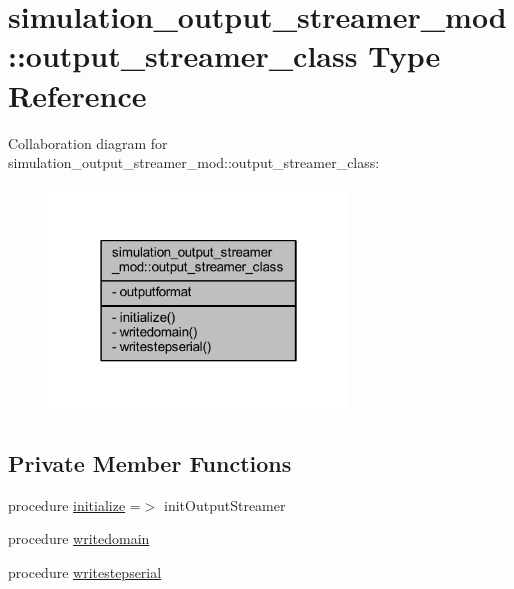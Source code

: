 \hypertarget{structsimulation__output__streamer__mod_1_1output__streamer__class}{}\section{simulation\+\_\+output\+\_\+streamer\+\_\+mod\+:\+:output\+\_\+streamer\+\_\+class Type Reference}
\label{structsimulation__output__streamer__mod_1_1output__streamer__class}


Collaboration diagram for simulation\+\_\+output\+\_\+streamer\+\_\+mod\+:\+:output\+\_\+streamer\+\_\+class\+:
\nopagebreak
\begin{figure}[H]
\begin{center}
\leavevmode
\includegraphics[width=226pt]{structsimulation__output__streamer__mod_1_1output__streamer__class__coll__graph}
\end{center}
\end{figure}
\subsection*{Private Member Functions}
\begin{DoxyCompactItemize}
\item 
procedure \mbox{\hyperlink{structsimulation__output__streamer__mod_1_1output__streamer__class_a374b9843dccfbc1c9395946fa36e17a9}{initialize}} =$>$ init\+Output\+Streamer
\item 
procedure \mbox{\hyperlink{structsimulation__output__streamer__mod_1_1output__streamer__class_a39baf48b09c72aa0b4864200e01a179f}{writedomain}}
\item 
procedure \mbox{\hyperlink{structsimulation__output__streamer__mod_1_1output__streamer__class_a6b886d232b22c9b3328d0b0322ede0bf}{writestepserial}}
\end{DoxyCompactItemize}
